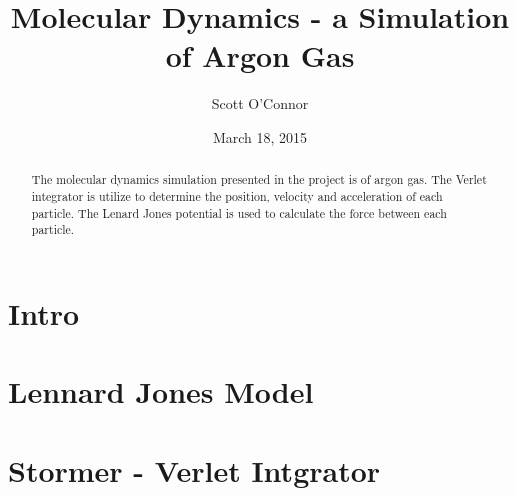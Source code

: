 \documentclass[10pt,a4paper]{article}
\title{Molecular Dynamics - a Simulation of Argon Gas}
\date{March 18, 2015}
\author{Scott O'Connor}
\begin{document}
\maketitle

\begin{abstract}
The molecular dynamics simulation presented in the project is of argon gas. The Verlet integrator is utilize to determine the position, velocity and acceleration of each particle. The Lenard Jones potential is used to calculate the force between each particle. 
\end{abstract}

\section{Intro}

\section{Lennard Jones Model}

\section{Stormer - Verlet Intgrator}
\end{document}
